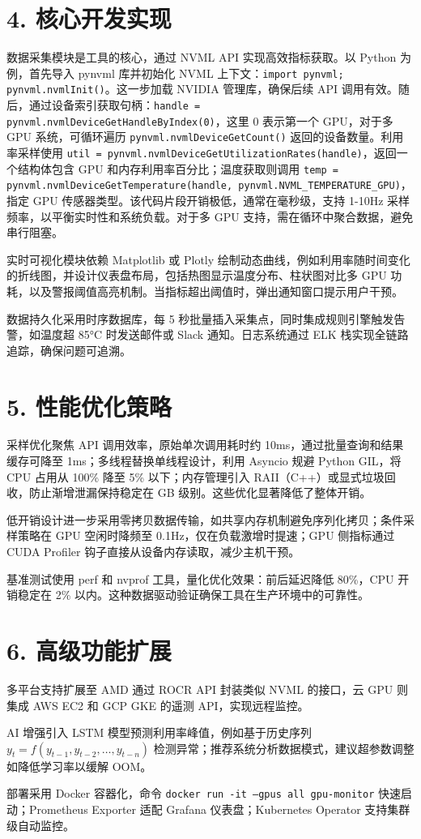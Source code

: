\chapter{4. 核心开发实现}
数据采集模块是工具的核心，通过 NVML API 实现高效指标获取。以 Python 为例，首先导入 pynvml 库并初始化 NVML 上下文：\texttt{import pynvml; pynvml.nvmlInit()}。这一步加载 NVIDIA 管理库，确保后续 API 调用有效。随后，通过设备索引获取句柄：\texttt{handle = pynvml.nvmlDeviceGetHandleByIndex(0)}，这里 0 表示第一个 GPU，对于多 GPU 系统，可循环遍历 \texttt{pynvml.nvmlDeviceGetCount()} 返回的设备数量。利用率采样使用 \texttt{util = pynvml.nvmlDeviceGetUtilizationRates(handle)}，返回一个结构体包含 GPU 和内存利用率百分比；温度获取则调用 \texttt{temp = pynvml.nvmlDeviceGetTemperature(handle, pynvml.NVML\_{}TEMPERATURE\_{}GPU)}，指定 GPU 传感器类型。该代码片段开销极低，通常在毫秒级，支持 1-10Hz 采样频率，以平衡实时性和系统负载。对于多 GPU 支持，需在循环中聚合数据，避免串行阻塞。\par
实时可视化模块依赖 Matplotlib 或 Plotly 绘制动态曲线，例如利用率随时间变化的折线图，并设计仪表盘布局，包括热图显示温度分布、柱状图对比多 GPU 功耗，以及警报阈值高亮机制。当指标超出阈值时，弹出通知窗口提示用户干预。\par
数据持久化采用时序数据库，每 5 秒批量插入采集点，同时集成规则引擎触发告警，如温度超 85°C 时发送邮件或 Slack 通知。日志系统通过 ELK 栈实现全链路追踪，确保问题可追溯。\par
\chapter{5. 性能优化策略}
采样优化聚焦 API 调用效率，原始单次调用耗时约 10ms，通过批量查询和结果缓存可降至 1ms；多线程替换单线程设计，利用 Asyncio 规避 Python GIL，将 CPU 占用从 100\%{} 降至 5\%{} 以下；内存管理引入 RAII（C++）或显式垃圾回收，防止渐增泄漏保持稳定在 GB 级别。这些优化显著降低了整体开销。\par
低开销设计进一步采用零拷贝数据传输，如共享内存机制避免序列化拷贝；条件采样策略在 GPU 空闲时降频至 0.1Hz，仅在负载激增时提速；GPU 侧指标通过 CUDA Profiler 钩子直接从设备内存读取，减少主机干预。\par
基准测试使用 perf 和 nvprof 工具，量化优化效果：前后延迟降低 80\%{}，CPU 开销稳定在 2\%{} 以内。这种数据驱动验证确保工具在生产环境中的可靠性。\par
\chapter{6. 高级功能扩展}
多平台支持扩展至 AMD 通过 ROCR API 封装类似 NVML 的接口，云 GPU 则集成 AWS EC2 和 GCP GKE 的遥测 API，实现远程监控。\par
AI 增强引入 LSTM 模型预测利用率峰值，例如基于历史序列 $y_t = f(y_{t-1}, y_{t-2}, \dots, y_{t-n})$ 检测异常；推荐系统分析数据模式，建议超参数调整如降低学习率以缓解 OOM。\par
部署采用 Docker 容器化，命令 \texttt{docker run -it --gpus all gpu-monitor} 快速启动；Prometheus Exporter 适配 Grafana 仪表盘；Kubernetes Operator 支持集群级自动监控。\par
